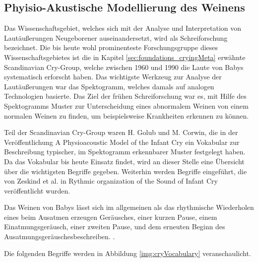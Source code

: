 \subsection{Phyisio-Akustische Modellierung des Weinens}
\label{sec:acousticModel}

Das Wissenschaftsgebiet, welches sich mit der Analyse und Interpretation von Lautäußerungen Neugeborener auseinandersetzt, wird als \glqq Schreiforschung\grqq{} bezeichnet. Die bis heute wohl prominenteste Forschungsgruppe dieses Wissenschaftsgebietes ist die in Kapitel \ref{sec:foundations_cryingMeta} erwähnte \glqq Scandinavian Cry-Group\grqq \cite{crygroup}, welche zwischen 1960 und 1990 die Laute von Babys systematisch erforscht haben. Das wichtigste Werkzeug zur Analyse der Lautäußerungen war das Spektogramm, welches damals auf analogen Technologien basierte. Das Ziel der frühen Schreiforschung war es, mit Hilfe des Spektogramms Muster zur Unterscheidung eines abnormalem Weinen von einem normalen Weinen zu finden, um beispielsweise Krankheiten erkennen zu können.\cite[S. 142]{signal} 

Teil der Scandinavian Cry-Group waren H. Golub und M. Corwin, die in der Veröffentlichung \glqq A Physioacoustic Model of the Infant Cry\grqq \cite{cryModel} ein Vokabular zur Beschreibung typischer, im Spektogramm erkennbarer Muster festgelegt haben. Da das Vokabular bis heute Einsatz findet, wird an dieser Stelle eine Übersicht über die wichtigsten Begriffe gegeben. Weiterhin werden Begriffe eingeführt, die von Zeskind et al. in \glqq Rythmic organization of the Sound of Infant Cry \grqq{} veröffentlicht wurden.\cite{rythmic}

Das Weinen von Babys lässt sich im allgemeinen als das \glqq rhythmische Wiederholen eines beim Ausatmen erzeugen Geräusches, einer kurzen Pause, einem Einatmungsgeräusch, einer zweiten Pause, und dem erneuten Beginn des Ausatmungsgeräusches\grqq beschreiben. \cite{wolff}.

Die folgenden Begriffe werden in Abbildung \ref{img:cryVocabulary} veranschaulicht.

